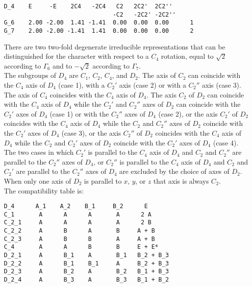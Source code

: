 \documentclass[12pt,a4paper,twoside]{report}
\begin{document}
\begin{tcolorbox}
\begin{footnotesize}
\begin{verbatim}
D_4    E     -E    2C4   -2C4   C2   2C2'  2C2''
                               -C2   -2C2' -2C2''
G_6    2.00 -2.00  1.41 -1.41  0.00  0.00  0.00      1
G_7    2.00 -2.00 -1.41  1.41  0.00  0.00  0.00      2
\end{verbatim}
\end{footnotesize}
\end{tcolorbox}

There are two two-fold degenerate irreducible representations that can be 
distinguished for the character with respect to a $C_4$ rotation, equal
to $\sqrt{2}$ according to $\Gamma_6$ and to $-\sqrt{2}$ according to $\Gamma_7$. \\
The subgroups of $D_4$ are $C_1$, $C_2$, $C_4$, and $D_2$. 
The axis of $C_2$ can coincide with the $C_4$ axis of $D_4$ (case 1), 
with a $C_2'$ axis (case 2) or with a $C_2''$ axis (case 3). 
The axis of $C_4$ coincides with the $C_4$ axis of $D_4$.
The axis $C_2$ of $D_2$ can coincide with the $C_4$ axis
of $D_4$ while the $C_2'$ and $C_2''$ axes of $D_2$ can coincide with the $C_2'$
axes of $D_4$ (case 1) or with the $C_2''$ axes of $D_4$ (case 2), 
or the axis $C_2'$ of $D_2$ coincides with the $C_4$ axis
of $D_4$ while the $C_2$ and $C_2''$ axes of $D_2$ coincide with the $C_2'$
axes of $D_4$ (case 3), or the axis $C_2''$ of $D_2$ coincides with the $C_4$ axis
of $D_4$ while the $C_2$ and $C_2'$ axes of $D_2$ coincide with the $C_2'$
axes of $D_4$ (case 4). The two cases in which $C_2'$ is parallel to the
$C_4$ axis of $D_4$ and $C_2$ and $C_2''$ are parallel to the $C_2''$ axes of
$D_4$, or $C_2''$ is parallel to the $C_4$ axis of $D_4$ and
$C_2$ and $C_2'$ are parallel to the $C_2''$ axes of $D_4$ are 
excluded by the choice of axes of $D_2$. When only one axis of $D_2$
is parallel to $x$, $y$, or $z$ that axis is always $C_2$. \\
The compatibility table is:

\begin{tcolorbox}
\begin{footnotesize}
\begin{verbatim}
D_4      A_1    A_2    B_1     B_2      E
C_1       A      A      A       A      2 A
C_2_1     A      A      A       A      2 B
C_2_2     A      B      A       B     A + B
C_2_3     A      B      B       A     A + B
C_4       A      A      B       B     E + E*      
D_2_1     A      B_1    A       B_1   B_2 + B_3
D_2_2     A      B_1    B_1     A     B_2 + B_3
D_2_3     A      B_2    A       B_2   B_1 + B_3
D_2_4     A      B_3    A       B_3   B_1 + B_2
\end{verbatim}
\end{footnotesize}
\end{tcolorbox}
\end{document}
